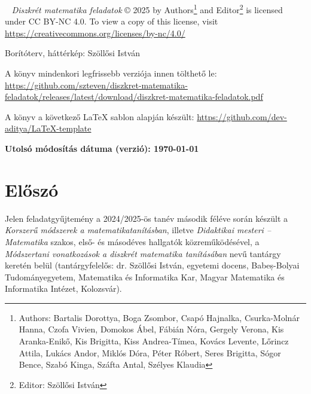 \documentclass[magyar]{package/fancy-book}
\begin{document}
	


\newpage
\thispagestyle{plain}
~
\vfill
\noindent \emph{Diszkrét matematika feladatok} \copyright{} 2025 by Authors\footnote{Authors: Bartalis Dorottya, Boga Zsombor, Csapó Hajnalka, Csurka-Molnár Hanna, Czofa Vivien, Domokos Ábel, Fábián Nóra, Gergely Verona, Kis Aranka-Enikő, Kis Brigitta, Kiss Andrea-Tímea, Kovács Levente, Lőrincz Attila, Lukács Andor, Miklós Dóra, Péter Róbert, Seres Brigitta, Sógor Bence, Szabó Kinga, Száfta Antal, Szélyes Klaudia} and Editor\footnote{Editor: Szöllősi István} is licensed under CC BY-NC 4.0. To view a copy of this license, visit \url{https://creativecommons.org/licenses/by-nc/4.0/}

\vspace*{1em}

\noindent Borítóterv, háttérkép: Szöllősi István

\vspace*{1em}

\noindent A könyv mindenkori legfrissebb verziója innen tölthető le: \url{https://github.com/szteven/diszkret-matematika-feladatok/releases/latest/download/diszkret-matematika-feladatok.pdf}

\vspace*{1em}

\noindent A könyv a következő \LaTeX{} sablon alapján készült: \url{https://github.com/dev-aditya/LaTeX-template}

\vspace*{3em}

{\large\noindent\textbf{Utolsó módosítás dátuma (verzió): \version\today}}

\vspace*{1em}



\newpage

\tableofcontents

\chapter*{Előszó}
\thispagestyle{plain}

Jelen feladatgyűjtemény a 2024/2025-ös tanév második féléve során
készült a \emph{Korszerű módszerek a matematikatanításban}, illetve
\emph{Didaktikai mesteri -- Matematika} szakos, első- és másodéves
hallgatók közreműködésével, a \emph{Módszertani vonatkozások a diszkrét
matematika tanításában} nevű tantárgy keretén belül (tantárgyfelelős:
dr. Szöllősi István, egyetemi docens, Babeș-Bolyai Tudományegyetem, Matematika és Informatika
Kar, Magyar Matematika és Informatika Intézet, Kolozsvár). 
\end{document}
